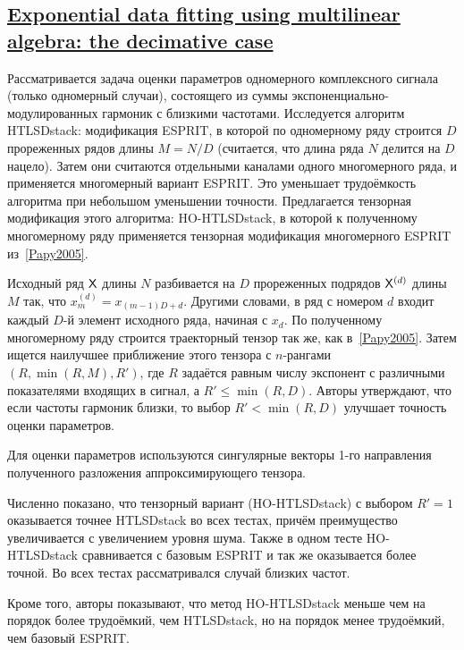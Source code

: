 \documentclass[12pt]{article}
\theoremstyle{plain}
\theoremstyle{definition}
\theoremstyle{remark}
\begin{document}
\subsection{\href{https://doi.org/10.1002/cem.1212}{Exponential data
fitting using multilinear algebra: the decima\-tive case}}\label{Papy2009}
Рассматривается задача оценки параметров
одномерного комплексного сигнала (только одномерный случаи),
состоящего из суммы экспоненциально-модулированных гармоник с
близкими частотами.
Исследуется алгоритм HTLSDstack: модификация ESPRIT, в которой
по одномерному ряду строится $D$ прореженных рядов длины $M = N / D$ (считается,
что длина ряда $N$ делится на $D$ нацело).
Затем они считаются отдельными каналами одного многомерного ряда, и применяется
многомерный вариант ESPRIT.
Это уменьшает трудоёмкость алгоритма при небольшом уменьшении точности.
Предлагается тензорная модификация этого алгоритма: HO-HTLSDstack, в которой
к полученному многомерному ряду применяется тензорная модификация
многомерного ESPRIT из~\ref{Papy2005}.

Исходный ряд $\mathsf{X}$ длины $N$ разбивается на $D$ прореженных
подрядов $\mathsf{X}^{(d)}$ длины $M$ так, что $x_m^{(d)}=x_{(m-1)D + d}$.
Другими словами, в ряд с номером $d$ входит каждый $D$-й элемент
исходного ряда, начиная с $x_d$.
По полученному многомерному ряду строится траекторный тензор так же,
как в~\ref{Papy2005}.
Затем ищется наилучшее приближение этого тензора с $n$-рангами
$(R,\min(R, M), R')$, где $R$ задаётся равным числу экспонент с
различными показателями входящих в сигнал, а $R' \leqslant \min(R, D)$.
Авторы утверждают, что если частоты гармоник близки, то выбор $R' < \min(R, D)$
улучшает точность оценки параметров.

Для оценки параметров используются сингулярные векторы 1-го
направления полученного разложения аппроксимирующего тензора.

Численно показано, что тензорный вариант (HO-HTLSDstack) с выбором
$R'=1$ оказывается точнее HTLSDstack во всех тестах, причём
преимущество увеличивается с увеличением уровня шума.
Также в одном тесте HO-HTLSDstack сравнивается с базовым ESPRIT и
так же оказывается более точной.
Во всех тестах рассматривался случай близких частот.

Кроме того, авторы показывают, что метод HO-HTLSDstack меньше чем на
порядок более трудоёмкий, чем HTLSDstack, но на порядок менее
трудоёмкий, чем базовый ESPRIT.
\end{document}
